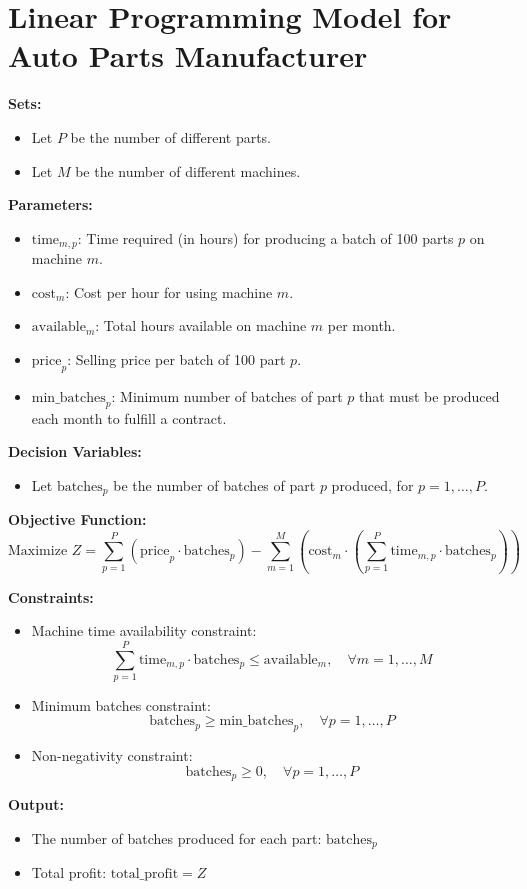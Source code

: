 \documentclass{article}
\begin{document}
\section*{Linear Programming Model for Auto Parts Manufacturer}

\textbf{Sets:}
\begin{itemize}
    \item Let \( P \) be the number of different parts.
    \item Let \( M \) be the number of different machines.
\end{itemize}

\textbf{Parameters:}
\begin{itemize}
    \item \( \text{time}_{m,p} \): Time required (in hours) for producing a batch of 100 parts \( p \) on machine \( m \).
    \item \( \text{cost}_{m} \): Cost per hour for using machine \( m \).
    \item \( \text{available}_{m} \): Total hours available on machine \( m \) per month.
    \item \( \text{price}_{p} \): Selling price per batch of 100 part \( p \).
    \item \( \text{min\_batches}_{p} \): Minimum number of batches of part \( p \) that must be produced each month to fulfill a contract.
\end{itemize}

\textbf{Decision Variables:}
\begin{itemize}
    \item Let \( \text{batches}_{p} \) be the number of batches of part \( p \) produced, for \( p = 1, \ldots, P \).
\end{itemize}

\textbf{Objective Function:}
\[
\text{Maximize } Z = \sum_{p=1}^{P} \left( \text{price}_{p} \cdot \text{batches}_{p} \right) - \sum_{m=1}^{M} \left( \text{cost}_{m} \cdot \left( \sum_{p=1}^{P} \text{time}_{m,p} \cdot \text{batches}_{p} \right) \right)
\]

\textbf{Constraints:}
\begin{itemize}
    \item Machine time availability constraint:
    \[
    \sum_{p=1}^{P} \text{time}_{m,p} \cdot \text{batches}_{p} \leq \text{available}_{m}, \quad \forall m = 1, \ldots, M
    \]
    \item Minimum batches constraint:
    \[
    \text{batches}_{p} \geq \text{min\_batches}_{p}, \quad \forall p = 1, \ldots, P
    \]
    \item Non-negativity constraint:
    \[
    \text{batches}_{p} \geq 0, \quad \forall p = 1, \ldots, P
    \]
\end{itemize}

\textbf{Output:}
\begin{itemize}
    \item The number of batches produced for each part: \( \text{batches}_{p} \)
    \item Total profit: \( \text{total\_profit} = Z \)
\end{itemize}
\end{document}
